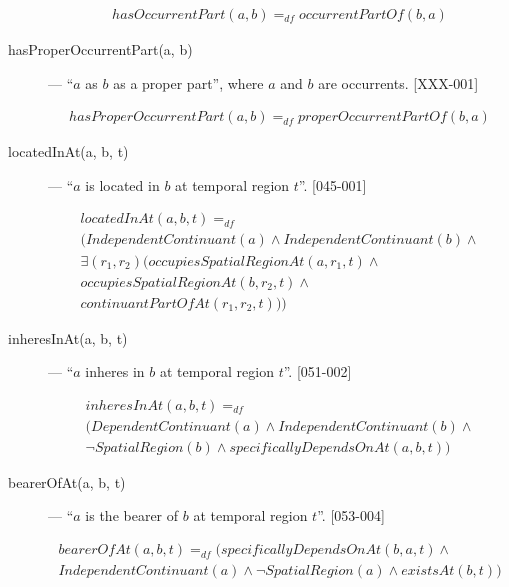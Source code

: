 \documentclass{article}
\newcommand{\DF}{\ensuremath{=_{df}}}
\begin{document}
\begin{description}
\begin{equation}
\begin{split}
hasOccurrentPart(a, b) \DF occurrentPartOf(b, a)
\end{split}
\end{equation}

\item[hasProperOccurrentPart(a, b)] --- ``$a$ as $b$ as a proper part'', where $a$ and $b$ are occurrents. [XXX-001]

\begin{equation}
\begin{split}
hasProperOccurrentPart(a, b) \DF properOccurrentPartOf(b, a)
\end{split}
\end{equation}

\item[locatedInAt(a, b, t)] --- ``$a$ is located in $b$ at temporal region $t$''. [045-001]

\begin{equation}
\begin{split}
locatedInAt(a, b, t) \DF \\
(IndependentContinuant(a) \wedge IndependentContinuant(b) \wedge \\
{\exists}(r_1, r_2)(occupiesSpatialRegionAt(a, r_1, t) \wedge \\
occupiesSpatialRegionAt(b, r_2, t) \wedge \\
continuantPartOfAt(r_1, r_2, t)))
\end{split}
\end{equation}

\item[inheresInAt(a, b, t)] --- ``$a$ inheres in $b$ at temporal region $t$''. [051-002]

\begin{equation}
\begin{split}
inheresInAt(a, b, t) \DF \\
(DependentContinuant(a) \wedge IndependentContinuant(b) \wedge \\
{\neg}SpatialRegion(b) \wedge specificallyDependsOnAt(a, b, t))
\end{split}
\end{equation}

\item[bearerOfAt(a, b, t)] --- ``$a$ is the bearer of $b$ at temporal region $t$''. [053-004]

\begin{equation}
\begin{split}
bearerOfAt(a, b, t) \DF (specificallyDependsOnAt(b, a, t) \wedge \\
IndependentContinuant(a) \wedge {\neg}SpatialRegion(a) \wedge existsAt(b, t))
\end{split}
\end{equation}


\end{description}
\end{document}
